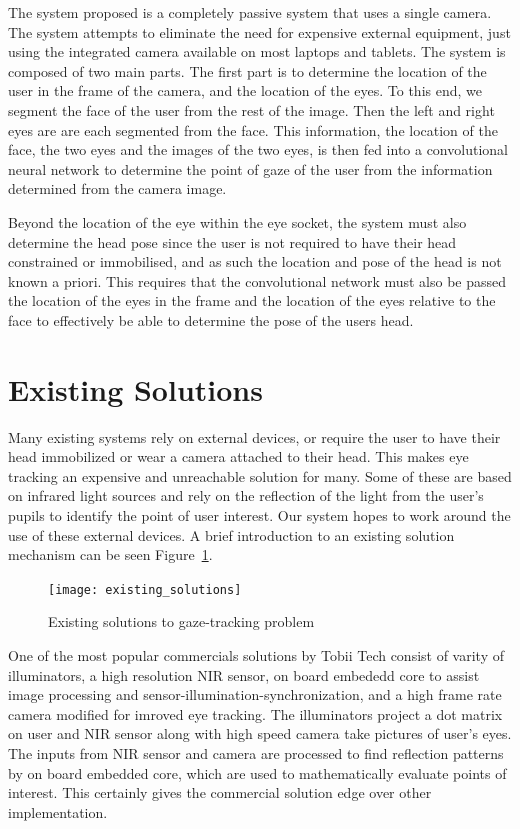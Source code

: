 \documentclass[10pt,twocolumn,letterpaper]{article}
\begin{document}
The system proposed is a completely passive system that uses a single
camera. The system attempts to eliminate the need for expensive
external equipment, just using the integrated camera available on most
laptops and tablets. The system is composed of two main parts. The first
part is to determine the location of the user in the frame of the camera, and the
location of the eyes. To this end, we segment the face of the user
from the rest of the image. Then the left and right eyes are are each
segmented from the face. This information, the location of the face,
the two eyes and the images of the two eyes, is then fed into a
convolutional neural network to determine the point of gaze of the
user from the information determined from the camera image.

Beyond the location of the eye within the eye socket, the system must
also determine the head pose since the user is not required to have
their head constrained or immobilised, and as such the location and
pose of the head is not known a priori. This requires that the
convolutional network must also be passed the location of the eyes in
the frame and the location of the eyes relative to the face to effectively be
able to determine the pose of the users head.


\section{Existing Solutions}
Many existing systems rely on external
devices\cite{eyetrackerlist}\cite{tobii_1}, or require the user to
have their head immobilized or wear a camera attached to their
head. This makes eye tracking an expensive and unreachable solution
for many. Some of these are based on infrared light sources and rely
on the reflection of the light from the user's pupils to identify the
point of user interest. Our system hopes to work around the use of
these external devices. A brief introduction to an existing solution
mechanism can be seen Figure~\ref{fig:existsol}.

\begin{figure}
  \begin{center}
    \texttt{[image: existing\_solutions]}
  \end{center}
  \caption{Existing solutions to gaze-tracking problem}
  \label{fig:existsol}
  \end{figure}

One of the most popular commercials solutions by Tobii Tech consist of varity of 
illuminators, a high resolution NIR sensor, on board embededd core to 
assist image processing and sensor-illumination-synchronization, 
and a high frame rate camera modified for imroved eye tracking. 
The illuminators project a dot matrix on user and NIR sensor along with 
high speed camera take pictures of user's eyes. The inputs from NIR sensor 
and camera are processed to find reflection patterns by on board embedded core, 
which are used to mathematically evaluate points of interest. 
This certainly gives the commercial solution edge over other implementation.
\end{document}
